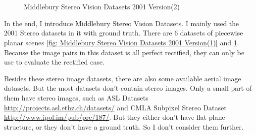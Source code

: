 \begin{figure}
	
	\centering
	 \\
	 \\
	\caption{Middlebury Stereo Vision Datasets 2001 Version(2) \cite{scharsteinTaxonomyEvaluationDense2001}}
	\label{Middlebury Stereo Vision Datasets 2001 Version(2)}
\end{figure}

In the end, I introduce Middlebury Stereo Vision Datasets. I mainly used the 2001 Stereo datasets in it with ground truth. There are 6 datasets of piecewise planar scenes \cref{fig: Middlebury Stereo Vision Datasets 2001 Version(1)} and \cref{Middlebury Stereo Vision Datasets 2001 Version(2)}. Because the image pairs in this dataset is all perfect rectified, they can only be use to evaluate the rectified case. 

Besides these stereo image datasets, there are also some available aerial image datasets. But the most datasets don't contain stereo images. Only a small part of them have stereo images, such as ASL Datasets  \url{http://projects.asl.ethz.ch/datasets/} and CMLA Subpixel Stereo Dataset  \url{http://www.ipol.im/pub/pre/187/}. But they either don't have flat plane structure, or they don't have a ground truth. So I don't consider them further.

